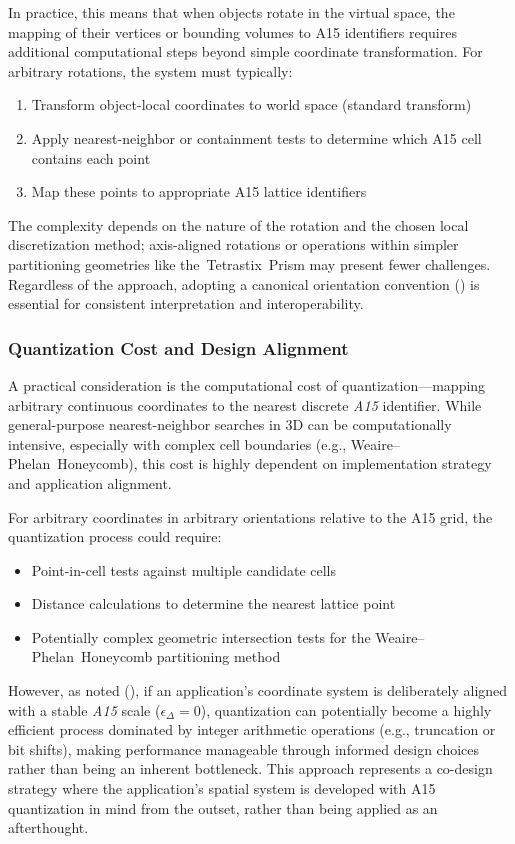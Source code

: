 \documentclass[10pt]{article}
\def\AAAB{\textit{A15}}
\def\WP{Weaire--Phelan}
\def\WPH{\WP{}~Honeycomb}
\def\TSP{Tetrastix~Prism}
\def\tTSP{the~\TSP{}}
\begin{document}
In practice, this means that when objects rotate in the virtual space, the mapping of their vertices or bounding volumes to A15 identifiers requires additional computational steps beyond simple coordinate transformation. For arbitrary rotations, the system must typically:
\begin{enumerate}\itemsep0pt
    \item Transform object-local coordinates to world space (standard transform)
    \item Apply nearest-neighbor or containment tests to determine which A15 cell contains each point
    \item Map these points to appropriate A15 lattice identifiers
\end{enumerate}

The complexity depends on the nature of the rotation and the chosen local discretization method; axis-aligned rotations or operations within simpler partitioning geometries like \tTSP{} may present fewer challenges. Regardless of the approach, adopting a canonical orientation convention () is essential for consistent interpretation and interoperability.

\subsubsection{Quantization Cost and Design Alignment}\label{subsubsec-limits-quantization}
A practical consideration is the computational cost of quantization—mapping arbitrary continuous coordinates to the nearest discrete \AAAB{} identifier. While general-purpose nearest-neighbor searches in 3D can be computationally intensive, especially with complex cell boundaries (e.g., \WPH{}), this cost is highly dependent on implementation strategy and application alignment.

For arbitrary coordinates in arbitrary orientations relative to the A15 grid, the quantization process could require:
\begin{itemize}\itemsep0pt
    \item Point-in-cell tests against multiple candidate cells
    \item Distance calculations to determine the nearest lattice point
    \item Potentially complex geometric intersection tests for the \WPH{} partitioning method
\end{itemize}

However, as noted (), if an application's coordinate system is deliberately aligned with a stable \AAAB{} scale ($\epsilon_\Delta = 0$), quantization can potentially become a highly efficient process dominated by integer arithmetic operations (e.g., truncation or bit shifts), making performance manageable through informed design choices rather than being an inherent bottleneck. This approach represents a co-design strategy where the application's spatial system is developed with A15 quantization in mind from the outset, rather than being applied as an afterthought.
\end{document}
